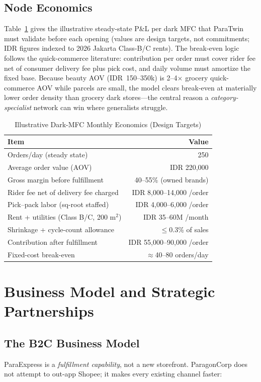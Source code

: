 \documentclass[journal]{IEEEtran}
\begin{document}
\subsection{Node Economics}
Table~\ref{tab:econ} gives the illustrative steady-state P\&L per dark MFC that ParaTwin must validate before each opening (values are design targets, not commitments; IDR figures indexed to 2026 Jakarta Class-B/C rents). The break-even logic follows the quick-commerce literature: contribution per order must cover rider fee net of consumer delivery fee plus pick cost, and daily volume must amortize the fixed base. Because beauty AOV (IDR~150--350k) is 2--4$\times$ grocery quick-commerce AOV while parcels are small, the model clears break-even at materially lower order density than grocery dark stores---the central reason a \emph{category-specialist} network can win where generalists struggle.

\begin{table}[!t]
\caption{Illustrative Dark-MFC Monthly Economics (Design Targets)}
\label{tab:econ}
\centering
\scriptsize
\begin{tabularx}{\columnwidth}{@{}X r@{}}
\toprule
\textbf{Item} & \textbf{Value} \\
\midrule
Orders/day (steady state) & 250 \\
Average order value (AOV) & IDR 220{,}000 \\
Gross margin before fulfillment & 40--55\% (owned brands) \\
Rider fee net of delivery fee charged & IDR 8{,}000--14{,}000 /order \\
Pick--pack labor (sq-root staffed) & IDR 4{,}000--6{,}000 /order \\
Rent + utilities (Class B/C, 200 m$^2$) & IDR 35--60M /month \\
Shrinkage + cycle-count allowance & $\le$0.3\% of sales \\
Contribution after fulfillment & IDR 55{,}000--90{,}000 /order \\
Fixed-cost break-even & $\approx$40--80 orders/day \\
\bottomrule
\end{tabularx}
\end{table}

\section{Business Model and Strategic Partnerships}
\label{sec:business}
\subsection{The B2C Business Model}
ParaExpress is a \emph{fulfillment capability}, not a new storefront. ParagonCorp does not attempt to out-app Shopee; it makes every existing channel faster:
\end{document}
